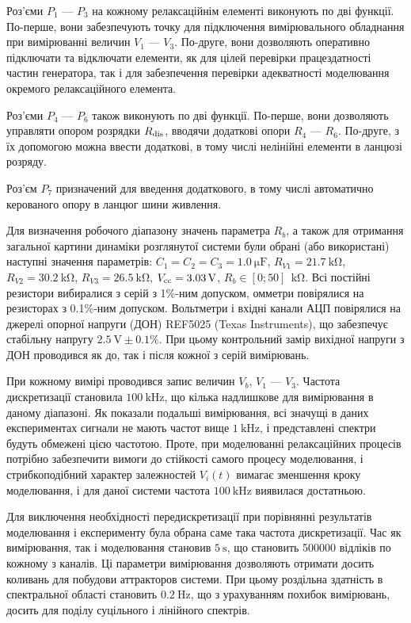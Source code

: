 Роз'єми
$P_1 $ --- $ P_3 $ на кожному релаксаційнім елементі виконують по дві
функції. По-перше, вони забезпечують точку для підключення
вимірювального обладнання при вимірюванні величин
$V_1 $ --- $ V_3 $. По-друге, вони дозволяють оперативно підключати та
відключати елементи, як для цілей перевірки працездатності
частин генератора, так і для забезпечення перевірки
адекватності моделювання окремого релаксаційного елемента.


Роз'єми
$P_4$ --- $ P_6 $ також виконують по дві функції. По-перше, вони дозволяють
управляти опором розрядки
$R _\mathrm{dis} $, вводячи додаткові опори 
$R_4$ --- $R_6$. По-друге, з їх допомогою можна ввести додаткові, в тому
числі нелінійні елементи в ланцюзі розряду.

Роз'єм
$P_7 $ призначений для введення додаткового, в тому числі
автоматично керованого опору в ланцюг шини живлення.

Для визначення робочого діапазону значень параметра
$R_b $, а також для отримання загальної картини динаміки
розглянутої системи були обрані (або використані) наступні
значення параметрів:
$C_1 = C_2 = C_3 = \SI{1.0}{\micro\farad}$,
$R_{V1} = \SI{21.7}{\kilo\ohm}$,
$R_{V2} = \SI{30.2}{\kilo\ohm}$,
$R_{V3} = \SI{26.5}{\kilo\ohm}$,
$V_\mathrm{cc} = \SI{3.03}{\volt}$,
$R_{b} \in [0;50]~ \SI{}{\kilo\ohm}$.
Всі постійні резистори вибиралися з серій з 1\%-ним допуском,
омметри повірялися на резисторах з 0.1\%-ним допуском. Вольтметри
і вхідні канали АЦП повірялися на джерелі опорної напруги (ДОН)
REF5025 (Texas Instruments), що забезпечує стабільну напругу
$\SI{2.5}{\volt} \pm 0.1 \% $. При цьому контрольний замір вихідної напруги
з ДОН проводився як до, так і після кожної з серій вимірювань.

При кожному вимірі проводився запис величин
$V_b $, $ V_1 $ --- $ V_3 $. Частота дискретизації становила
$\SI{100}{\kilo \hertz} $, що кілька надлишкове для вимірювання в даному
діапазоні. Як показали подальші вимірювання, всі значущі в
даних експериментах сигнали не мають частот вище
$\SI{1}{\kilo \hertz} $, і представлені спектри будуть обмежені цією
частотою. Проте, при моделюванні релаксаційних процесів
потрібно забезпечити вимоги до стійкості самого процесу
моделювання, і стрибкоподібний характер залежностей
$V_i (t) $ вимагає зменшення кроку моделювання, і для даної системи
частота
$\SI{100}{\kilo \hertz} $ виявилася достатньою.

Для виключення необхідності передискретизації при порівнянні
результатів моделювання і експерименту була обрана саме така
частота дискретизації. Час як вимірювання, так і моделювання
становив
$\SI{5}{\s} $, що становить 500000 відліків по кожному з каналів. Ці
параметри вимірювання дозволяють отримати досить коливань для
побудови аттракторов системи. При цьому роздільна здатність в спектральної
області становить
$\SI{0.2}{\hertz} $, що з урахуванням похибок вимірювань, досить для
поділу суцільного і лінійного спектрів.


